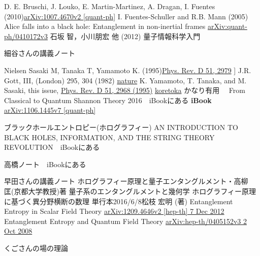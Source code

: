 \begin{thebibliography}{2}
D. E. Bruschi, J. Louko, E. Martin-Martinez, A. Dragan, I. Fuentes (2010)\href{https://arxiv.org/abs/1007.4670}{arXiv:1007.4670v2 [quant-ph]}
 I. Fuentes-Schuller and R.B. Mann (2005) Alice falls into a black hole: Entanglement in non-inertial frames \href{https://arxiv.org/pdf/quant-ph/0410172.pdf}{arXiv:quant-ph/0410172v3}
 石坂 智，小川朋宏 他 (2012) 量子情報科学入門

 細谷さんの講義ノート

 Nielsen
 Sasaki M, Tanaka T, Yamamoto K.  (1995)\href{https://journals.aps.org/prd/abstract/10.1103/PhysRevD.51.2979}{Phys. Rev. D 51, 2979}
] J.R. Gott, III, (London) 295, 304 (1982)
\href{https://www.nature.com/nature/journal/v368/n6467/abs/368108a0.html}{nature}
 K. Yamamoto, T. Tanaka, and M. Sasaki, this issue,
\href{https://watermark.silverchair.com/90-5-1019.pdf?token=AQECAHi208BE49Ooan9kkhW_Ercy7Dm3ZL_9Cf3qfKAc485ysgAAAdkwggHVBgkqhkiG9w0BBwagggHGMIIBwgIBADCCAbsGCSqGSIb3DQEHATAeBglghkgBZQMEAS4wEQQMG7YI38EtQrzzIPENAgEQgIIBjBSLn2OZbwlN_u91wKv1rKH3wDpJpjyWRv4FYJ5vYvv7PWYWxyZlINUnFvQMSSzDOfZgN4fgSpRTjz7MJ971ddX61rCv_dscoP2md2HIngTwHbGzgVBBj-mqBEuSICESGYqckZ8xb4iEoRgpPudT5XrmHabrhGs1oxj5axceO4M-Fgc2R9Ok2SR93WITWsjDzTAKD8t-3jkpG_uZ3iBPham6ZEsxO9QDt9ait7n8sntIk1z4zlyvScrXCINrP74c-rxEktj2dk-ay-Uyv74SX78S5_VN0PghKFLnrfCefHyjbHHt-3-PXP2JSCBH-kqocf5FumgyNffxr2TXCHNWV1AmarYIUEhyt495bHTum1sJYYSUw2q2Z147tvmUHce3255MOGiCKIv2E7_nHoQIrXUX5uh5ouJAn_MH6DoNMQw10c1PgNK4STFTW78w8yV44tknOxk74LpYF9jY-IWbGPv5veRA2eRN8X2qN8GbE9KnUauDqLi35FS9BotRz2ulHI7GHJhyDQuVYwn9Jg}{Phys. Rev. D 51, 2968 (1995)}
\href{http://iopscience.iop.org/article/10.1088/0305-4470/10/10/006/pdf}{koretoka}
かなり有用　
  From Classical to Quantum Shannon Theory 2016　iBookにある \textbf{iBook} \href{https://arxiv.org/pdf/1106.1445.pdf}{arXiv:1106.1445v7 [quant-ph]}

ブラックホールエントロピー(ホログラフィー)
 AN INTRODUCTION TO BLACK HOLES, INFORMATION,
AND THE STRING THEORY REVOLUTION　iBookにある

 高橋ノート　iBookにある

 早田さんの講義ノート
ホログラフィー原理と量子エンタングルメント・高柳　匡(京都大学教授)著
量子系のエンタングルメントと幾何学 ホログラフィー原理に基づく異分野横断の数理 単行本2016/6/8松枝 宏明 (著)
Entanglement Entropy in Scalar Field Theory  \href{https://arxiv.org/abs/1209.4646v2}{arXiv:1209.4646v2 [hep-th] 7 Dec 2012}
Entanglement Entropy and Quantum Field Theory \href{https://arxiv.org/abs/hep-th/0405152v3}{arXiv:hep-th/0405152v3 2 Oct 2008}

くごさんの場の理論

\end{thebibliography}

